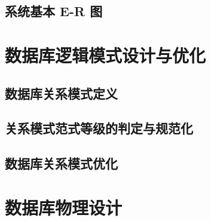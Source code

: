 \documentclass{article}
\begin{document}
\subsection{系统基本 E-R 图}

\section{数据库逻辑模式设计与优化}
\subsection{数据库关系模式定义}

\subsection{关系模式范式等级的判定与规范化}

\subsection{数据库关系模式优化}

\section{数据库物理设计}
\end{document}
